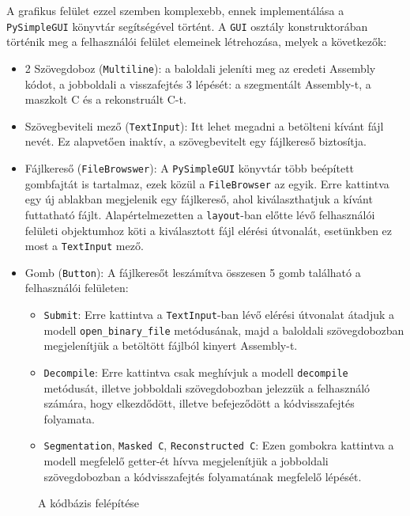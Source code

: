 A grafikus felület ezzel szemben komplexebb, ennek implementálása a
\texttt{PySimpleGUI}\cite{pysimplegui} könyvtár segítségével történt.
A \texttt{GUI} osztály konstruktorában történik meg a felhasználói felület
elemeinek létrehozása, melyek a következők:
\begin{itemize}
    \item 2 Szövegdoboz (\texttt{Multiline}): a baloldali jeleníti meg az
    eredeti Assembly kódot, a jobboldali a visszafejtés 3 lépését:
    a szegmentált Assembly-t, a maszkolt C és a rekonstruált C-t.
    \item Szövegbeviteli mező (\texttt{TextInput}): Itt lehet megadni
    a betölteni kívánt fájl nevét. Ez alapvetően inaktív, a szövegbevitelt egy
    fájlkereső biztosítja.
    \item Fájlkereső (\texttt{FileBrowswer}): A \texttt{PySimpleGUI} könyvtár több beépített gombfajtát is tartalmaz,
        ezek közül a \texttt{FileBrowser} az egyik. Erre kattintva egy új ablakban megjelenik egy fájlkereső, ahol
        kiválaszthatjuk a kívánt futtatható fájlt. Alapértelmezetten a \texttt{layout}-ban előtte lévő felhasználói
        felületi objektumhoz köti a kiválasztott fájl elérési útvonalát, esetünkben ez most a \texttt{TextInput}
        mező.
    \item Gomb (\texttt{Button}): A fájlkeresőt leszámítva összesen 5 gomb található a felhasználói felületen:
    \begin{itemize}
        \item \texttt{Submit}: Erre kattintva a \texttt{TextInput}-ban lévő elérési útvonalat átadjuk a modell
            \texttt{open\_binary\_file} metódusának, majd a baloldali szövegdobozban megjelenítjük a betöltött
            fájlból kinyert Assembly-t.
        \item \texttt{Decompile}: Erre kattintva csak meghívjuk a modell \texttt{decompile} metódusát, illetve
            jobboldali szövegdobozban jelezzük a felhasználó számára, hogy elkezdődött, illetve befejeződött
            a kódvisszafejtés folyamata.
        \item \texttt{Segmentation}, \texttt{Masked C}, \texttt{Reconstructed C}: Ezen gombokra kattintva a modell
            megfelelő getter-ét hívva megjelenítjük a jobboldali szövegdobozban a kódvisszafejtés folyamatának
            megfelelő lépését.
    \end{itemize}
\end{itemize}

\begin{figure}[H]
	\centering
	
	\caption{A kódbázis felépítése}
	\label{fig:file-system}
\end{figure}

